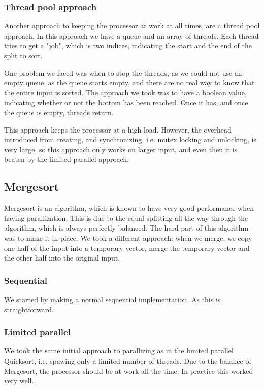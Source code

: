 \subsubsection{Thread pool approach}
Another approach to keeping the processor at work at all times, are a thread
pool approach. In this approach we have a queue and an array of threads. Each
thread tries to get a "job", which is two indices, indicating the start and the
end of the split to sort.

One problem we faced was when to stop the threads, as we could not use an empty
queue, as the queue starts empty, and there are no real way to know that the
entire input is sorted. The approach we took was to have a boolean value,
indicating whether or not the bottom has been reached. Once it has, and once
the queue is empty, threads return.

This approach keeps the processor at a high load. However, the overhead
introduced from creating, and synchronizing, i.e. mutex locking and unlocking,
is very large, so this approach only works on larger input, and even then it is
beaten by the limited parallel approach.

\subsection{Mergesort}
Mergesort is an algorithm, which is known to have very good performance when
having parallization. This is due to the equal splitting all the way through
the algorithm, which is always perfectly balanced. The hard part of this
algorithm was to make it in-place. We took a different approach: when we merge,
we copy one half of the input into a temporary vector, merge the temporary
vector and the other half into the original input.

\subsubsection{Sequential}
We started by making a normal sequential implementation. As this is
straightforward.

\subsubsection{Limited parallel}
We took the same initial approach to parallizing as in the limited parallel
Quicksort, i.e. spawing only a limited number of threads. Due to the balance of
Mergesort, the processor should be at work all the time. In practice this
worked very well.


